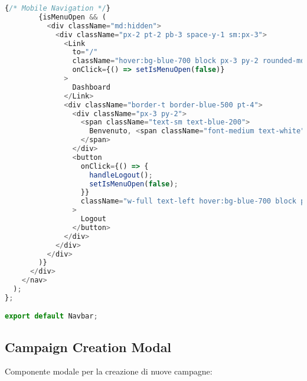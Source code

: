 \documentclass[12pt,a4paper]{report}
\begin{document}
\begin{lstlisting}[language=JavaScript, caption=Navbar.jsx - Navigation Component]
        {/* Mobile Navigation */}
        {isMenuOpen && (
          <div className="md:hidden">
            <div className="px-2 pt-2 pb-3 space-y-1 sm:px-3">
              <Link
                to="/"
                className="hover:bg-blue-700 block px-3 py-2 rounded-md text-base font-medium"
                onClick={() => setIsMenuOpen(false)}
              >
                Dashboard
              </Link>
              <div className="border-t border-blue-500 pt-4">
                <div className="px-3 py-2">
                  <span className="text-sm text-blue-200">
                    Benvenuto, <span className="font-medium text-white">{user?.username}</span>
                  </span>
                </div>
                <button
                  onClick={() => {
                    handleLogout();
                    setIsMenuOpen(false);
                  }}
                  className="w-full text-left hover:bg-blue-700 block px-3 py-2 rounded-md text-base font-medium text-red-200 hover:text-red-100"
                >
                  Logout
                </button>
              </div>
            </div>
          </div>
        )}
      </div>
    </nav>
  );
};

export default Navbar;
\end{lstlisting}

\subsection{Campaign Creation Modal}

Componente modale per la creazione di nuove campagne:
\end{document}
